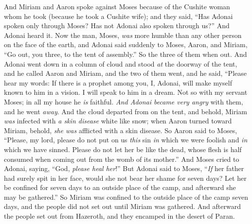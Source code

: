 \begin{biblechapter} %
 And Miriam and Aaron spoke against Moses because of the Cushite woman whom he took (because he took a Cushite wife);
\verse and they said, “Has Adonai spoken only through Moses? Has not Adonai also spoken through us?” And Adonai heard it.
\verse Now the man, Moses, \textit{was} more humble than any other person on the face of the earth,
\verse and Adonai said suddenly to Moses, Aaron, and Miriam, “Go out, you three, to the tent of assembly.” So the three of them when out.
\verse And Adonai went down in a column of cloud and stood \textit{at} the doorway of the tent, and he called Aaron and Miriam, and the two of them went,
\verse and he said,
\verse “Please hear my words: 
If there is a prophet among you, I, Adonai, 
will make myself known to him in a vision. 
I will speak to him in a dream.
\verse Not so with my servant Moses; 
in all my house he \textit{is} faithful.
\verse \textit{And Adonai became very angry} with them, and he went \textit{away}.
\verse And the cloud departed from on the tent, and behold, Miriam \textit{was} infected with \textit{a skin disease} white like snow; when Aaron turned toward Miriam, behold, \textit{she was} afflicted with a skin disease.
\verse So Aaron said to Moses, “Please, my lord, please do not put on us \textit{this} sin \textit{in} which we were foolish and \textit{in} which we have sinned.
\verse Please do not let her be like the dead, whose flesh is half consumed when coming out from the womb of its mother.”
\verse And Moses cried to Adonai, saying, “God, \textit{please heal her}!”
\verse But Adonai said to Moses, “\textit{If} her father had surely spit in her face, would she not bear her shame for seven days? Let her be confined for seven days to an outside place of the camp, and afterward she may be gathered.”
\verse So Miriam was confined to the outside place of the camp seven days, and the people did not set out until Miriam was gathered.
\verse And afterward the people set out from Hazeroth, and they encamped in the desert of Paran.
\end{biblechapter}

